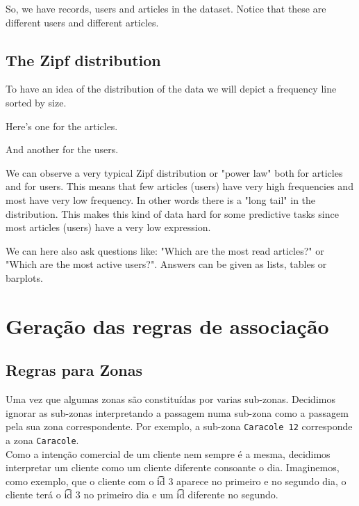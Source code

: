 \documentclass[a4paper]{article}
\begin{document}
So, we have records, users and  articles in the dataset. Notice that these are different users and different articles. 

\subsection{The Zipf distribution}

To have an idea of the distribution of the data we will depict a frequency line sorted by size.

Here's one for the articles.



And another for the users.



We can observe a very typical Zipf distribution or "power law" both for articles and for users. This means that few articles (users) have very high frequencies and most have very low frequency. In other words there is a "long tail" in the distribution. This makes this kind of data hard for some predictive tasks since most articles (users) have a very low expression.

We can here also ask questions like: "Which are the most read articles?" or "Which are the most active users?". Answers can be given as lists, tables or barplots.


\section{Geração das regras de associação}

\subsection{Regras para Zonas}

Uma vez que algumas zonas são constituídas por varias sub-zonas. Decidimos ignorar as sub-zonas interpretando a passagem numa sub-zona como a passagem pela sua zona correspondente. Por exemplo, a sub-zona {\tt Caracole 12} corresponde a zona {\tt Caracole}.\\
Como a intenção comercial de um cliente nem sempre é a mesma, decidimos interpretar um cliente como um cliente diferente consoante o dia. Imaginemos, como exemplo, que o cliente com o {\t id 3} aparece no primeiro e no segundo dia, o cliente terá o {\t id 3} no primeiro dia e um {\t id} diferente no segundo.   
\end{document}
